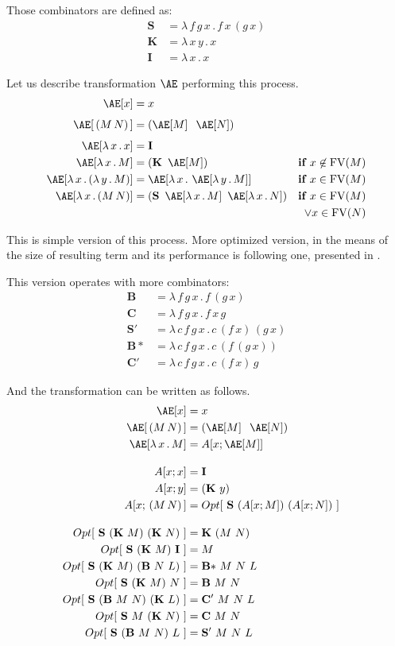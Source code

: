 \documentclass[conference]{IEEEtran}
\newcommand{\Lets}{Let us\xspace}
\newcommand{\lamb}[2]{( \lambda \, #1 \, . \, #2 )}
\newcommand{\lam}[2]{\lambda \, #1 \, . \, #2}
\newcommand{\FV}{\mathop{\mathrm{FV}}}
\newcommand{\Scomb }{\mathbf{S}}
\newcommand{\Kcomb }{\mathbf{K}}
\newcommand{\Icomb }{\mathbf{I}}
\newcommand{\Ae}{\mathop{\mathrm{\AE}}}
\newcommand{\Bcomb }{\mathbf{B}}
\newcommand{\BBcomb }{\mathbf{B*}}
\newcommand{\Ccomb }{\mathbf{C}}
\newcommand{\CCcomb }{\mathbf{C'}}
\newcommand{\SScomb }{\mathbf{S'}}
\begin{document}
Those combinators are defined as:
\begin{align*}
\Scomb &= \lam{f\,g\,x}{f\,x\,(g\,x)} \\
\Kcomb &= \lam{x\,y}{x} \\
\Icomb &= \lam{x}{x} 
\end{align*}


\Lets describe transformation $\Ae$ performing this process.
\begin{align*}
\Ae[x]           &= x &\\[0.4em]
\Ae[\,(M\,N)\,]  &= (\Ae[M]\;\;\Ae[N]) &\\[0.4em]
\Ae[\lam{x}{x}]  &= \Icomb &\\
\Ae[\lam{x}{M}]  &= (\Kcomb~\Ae[M]) &\textbf{if } x \not\in \FV(M)\\
\Ae[\lam{x}{\lamb{y}{M}}] &= \Ae[\lam{x}{\Ae[\lam{y}{M}]}]  
&\textbf{if } x \in \FV(M)\\
\Ae[\lam{x}{(M\,N)}] &= (\Scomb~\Ae[\lam{x}{M}]~\Ae[\lam{x}{N}])  
&\textbf{if } x \in \FV(M) \\
&&\vee x \in \FV(N)
\end{align*}


This is simple version of this process. More optimized version,
in the means of the size of resulting term and its performance
is following one, presented in \cite{jones87}.

This version operates with more combinators:
\begin{align*}
\Bcomb  &= \lam{f\,g\,x}{f\,(g\,x)} \\
\Ccomb  &= \lam{f\,g\,x}{f\,x\,g} \\
\SScomb &= \lam{c\,f\,g\,x}{c\,(f\,x)\,(g\,x)} \\
\BBcomb &= \lam{c\,f\,g\,x}{c\,(f\,(g\,x))} \\
\CCcomb &= \lam{c\,f\,g\,x}{c\,(f\,x)\,g} 
\end{align*}

And the transformation can be written as follows.
\begin{align*}
\Ae[x]           &= x &\\
\Ae[\,(M\,N)\,]  &= (\Ae[M]\;\;\Ae[N]) &\\
\Ae[\lam{x}{M}]  &= A[ x ; \Ae[M] ] &
\\[1em]
A[x;x]           &= \Icomb &\\
A[x;y]           &= (\Kcomb~y)\\
A[x;\,(M\,N)\,]  &= Opt[~\Scomb~(A[x;M])~(A[x;N])~]
\\[1em]
Opt[~\Scomb~(\Kcomb~M)~(\Kcomb~N)~]   &= \Kcomb~(M~N)\\
Opt[~\Scomb~(\Kcomb~M)~\Icomb~]       &= M\\
Opt[~\Scomb~(\Kcomb~M)~(\Bcomb~N~L)~] &= \BBcomb~M~N~L\\
Opt[~\Scomb~(\Kcomb~M)~N~]            &= \Bcomb~M~N\\
Opt[~\Scomb~(\Bcomb~M~N)~(\Kcomb~L)~] &= \CCcomb~M~N~L\\
Opt[~\Scomb~M~(\Kcomb~N)~]            &= \Ccomb~M~N\\
Opt[~\Scomb~(\Bcomb~M~N)~L~]          &= \SScomb~M~N~L
\end{align*}
\end{document}
